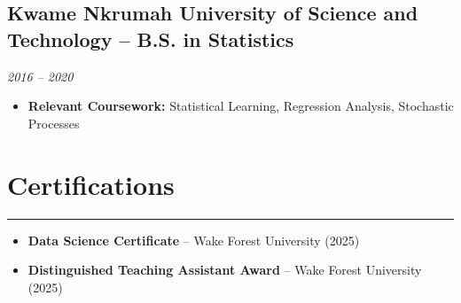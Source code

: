 \documentclass[a4paper,11pt]{article}
\begin{document}
\subsection*{Kwame Nkrumah University of Science and Technology – B.S. in Statistics}
\textit{2016 – 2020}
\begin{itemize}
    \item \textbf{Relevant Coursework:} Statistical Learning, Regression Analysis, Stochastic Processes
\end{itemize}

\section*{Certifications}
\hrule \vspace{2mm}
\begin{itemize}
    \item \textbf{Data Science Certificate} – Wake Forest University (2025)
    \item \textbf{Distinguished Teaching Assistant Award} – Wake Forest University (2025)
\end{itemize}
\end{document}
